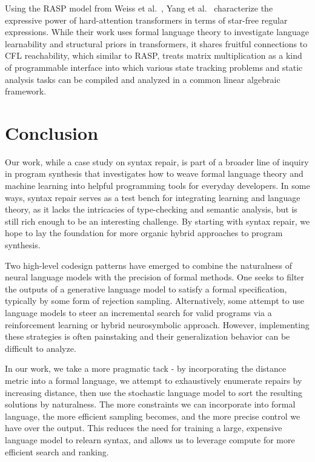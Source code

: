 \documentclass[sigplan,review,acmsmall,nonacm,screen,anonymous]{acmart}\settopmatter{printfolios=false,printccs=false,printacmref=false}
\begin{document}
Using the RASP model from Weiss et al.~\cite{weiss2021thinking}, Yang et al.~\cite{yang2024masked} characterize the expressive power of hard-attention transformers in terms of star-free regular expressions. While their work uses formal language theory to investigate language learnability and structural priors in transformers, it shares fruitful connections to CFL reachability, which similar to RASP, treats matrix multiplication as a kind of programmable interface into which various state tracking problems and static analysis tasks can be compiled and analyzed in a common linear algebraic framework.

\clearpage\section{Conclusion}\label{sec:conclusion}

Our work, while a case study on syntax repair, is part of a broader line of inquiry in program synthesis that investigates how to weave formal language theory and machine learning into helpful programming tools for everyday developers. In some ways, syntax repair serves as a test bench for integrating learning and language theory, as it lacks the intricacies of type-checking and semantic analysis, but is still rich enough to be an interesting challenge. By starting with syntax repair, we hope to lay the foundation for more organic hybrid approaches to program synthesis.

Two high-level codesign patterns have emerged to combine the naturalness of neural language models with the precision of formal methods. One seeks to filter the outputs of a generative language model to satisfy a formal specification, typically by some form of rejection sampling. Alternatively, some attempt to use language models to steer an incremental search for valid programs via a reinforcement learning or hybrid neurosymbolic approach. However, implementing these strategies is often painstaking and their generalization behavior can be difficult to analyze.

In our work, we take a more pragmatic tack - by incorporating the distance metric into a formal language, we attempt to exhaustively enumerate repairs by increasing distance, then use the stochastic language model to sort the resulting solutions by naturalness. The more constraints we can incorporate into formal language, the more efficient sampling becomes, and the more precise control we have over the output. This reduces the need for training a large, expensive language model to relearn syntax, and allows us to leverage compute for more efficient search and ranking.
\end{document}
